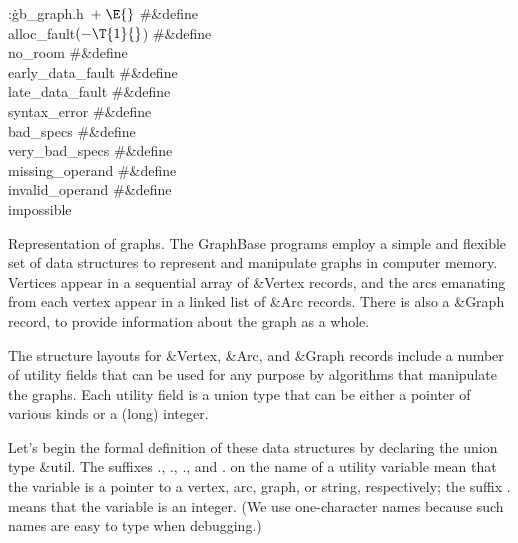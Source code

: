\Y\B\4:\.{gb\_graph.h\,}\X${}\mathrel+\E{}$\6
\8\#\&{define} \\{alloc\_fault}\5${}({-}\T{1}{}$)\6
\8\#\&{define} \\{no\_room}\5\6
\8\#\&{define} \\{early\_data\_fault}\5\6
\8\#\&{define} \\{late\_data\_fault}\5\6
\8\#\&{define} \\{syntax\_error}\5\6
\8\#\&{define} \\{bad\_specs}\5\6
\8\#\&{define} \\{very\_bad\_specs}\5\6
\8\#\&{define} \\{missing\_operand}\5\6
\8\#\&{define} \\{invalid\_operand}\5\6
\8\#\&{define} \\{impossible}\5\par
\fi

Representation of graphs. The GraphBase programs employ a simple
and flexible set of data structures to represent and manipulate graphs
in computer memory.  Vertices appear in a sequential array of
\&{Vertex} records, and the arcs emanating from each vertex appear in
a linked list of \&{Arc} records. There is also a \&{Graph} record, to
provide information about the graph as a whole.

The structure layouts for \&{Vertex}, \&{Arc}, and \&{Graph} records
include a number of utility fields that can be used for any purpose by
algorithms that manipulate the graphs. Each utility field is a union
type that can be either a pointer of various kinds or a (long) integer.

Let's begin the formal definition of these data structures by declaring the
union type \&{util}. The suffixes ., ., ., and . on the name
of a utility variable mean that the variable is a pointer to a vertex, arc,
graph, or string, respectively; the suffix . means that the variable is
an integer. (We use one-character names because such names are easy to type
when debugging.)

